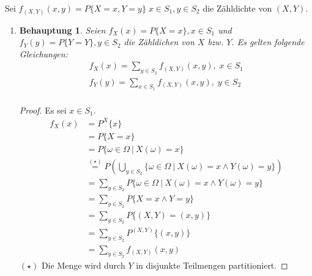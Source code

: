 \documentclass[a4paper]{scrartcl}
\newtheorem*{behaupt}{Behauptung}
\begin{document}
\begin{enumerate}[label=\bfseries\arabic*.]
        Sei $f_{(X,Y)}(x,y) = P\{X = x, Y = y\}\; x \in S_1, y \in S_2$ die
        Zähldichte von $(X, Y)$.
        \begin{enumerate}[label=(\alph*)]
            \item
                \begin{behaupt}
                    Seien $f_X(x) = P\{X = x\}, x \in S_1$ und
                    $f_Y(y) = P\{Y = Y\}, y \in S_2$ die Zähldichen von $X$ bzw.
                    $Y$.
                    Es gelten folgende Gleichungen:
                    \begin{align*}
                    f_X(x) = \sum_{y \in S_2} f_{(X,Y)}(x, y), \; x \in S_1 \\
                    f_Y(y) = \sum_{x \in S_1} f_{(X,Y)}(x, y), \; y \in S_2 \\
                    \end{align*}
                \end{behaupt}
                \begin{proof}
                    Es sei $x \in S_1$.
                    \begin{equation*}
                        \begin{split}
                            f_X(x) &= P^X\{ x \} \\
                            &= P\{ X = x \} \\
                            &= P\{ \omega \in \Omega \ |\ X(\omega) = x \} \\
                            &\stackrel{(\star)}{=} P \left( \bigcup_{y \in S_2}
                                \{ \omega \in \Omega \ |\ X(\omega) = x
                                \land Y(\omega) = y \} \right) \\
                            &= \sum_{y \in S_2} P \{ \omega \in \Omega \ |\ 
                                X(\omega) = x \land Y(\omega) = y \} \\
                            &= \sum_{y \in S_2} P \{ X = x \land Y = y \} \\
                            &= \sum_{y \in S_2} P \{ (X, Y) = (x, y) \} \\
                            &= \sum_{y \in S_2} P^{(X, Y)} \{ (x, y) \} \\
                            &= \sum_{y \in S_2} f_{(X, Y)} (x, y)
                        \end{split}
                    \end{equation*}
                    $(\star)$ Die Menge wird durch $Y$ in disjunkte Teilmengen
                    partitioniert.


\end{proof}
\end{enumerate}
\end{enumerate}
\end{document}
